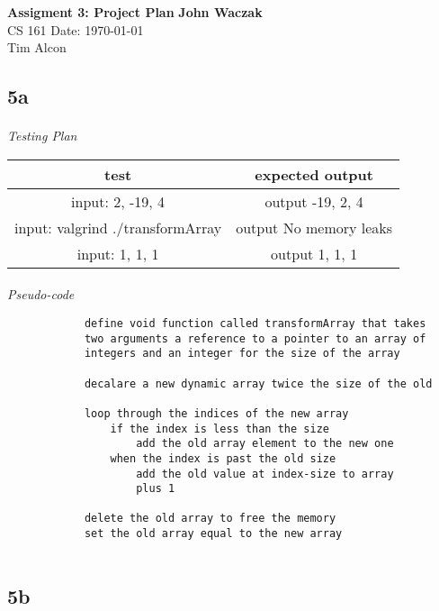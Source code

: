 \documentclass[a4paper, 11pt]{article}
\begin{document}
\noindent
\large\textbf{Assigment 3: Project Plan} \hfill \textbf{John Waczak} \\
\normalsize CS 161 \hfill  Date: \today \\
Tim Alcon \\


\subsection*{5a}
	\paragraph{}
		\textit{Testing Plan}
		
		\begin{center}
			\begin{tabular}{|c|c|}
				\hline
				\textbf{test} & \textbf{expected output} \\ 
				\hline 
				input: 2, -19, 4 & output -19, 2, 4 \\ 
				\hline
				input: valgrind ./transformArray & output No memory leaks \\ 
				\hline
				input: 1, 1, 1 & output 1, 1, 1 \\ 
				\hline
			\end{tabular}
		\end{center}
	\paragraph{}
		\textit{Pseudo-code}
		\begin{lstlisting}	
			define void function called transformArray that takes
			two arguments a reference to a pointer to an array of 
			integers and an integer for the size of the array 
			
			decalare a new dynamic array twice the size of the old 
			
			loop through the indices of the new array 
				if the index is less than the size 
					add the old array element to the new one 
				when the index is past the old size 
					add the old value at index-size to array 
					plus 1
			
			delete the old array to free the memory 
			set the old array equal to the new array
				
		\end{lstlisting} 

\subsection*{5b} 
\end{document}
